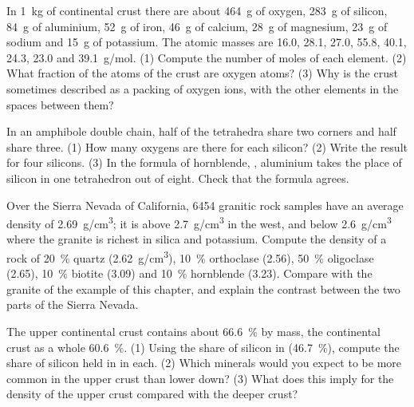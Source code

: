 \begin{exercise}[$\star\star\star$]\label{exo:g11:minerals:12}
In \qty{1}{kg} of continental crust there are about \qty{464}{g} of oxygen,
\qty{283}{g} of silicon, \qty{84}{g} of aluminium, \qty{52}{g} of iron,
\qty{46}{g} of calcium, \qty{28}{g} of magnesium, \qty{23}{g} of sodium and
\qty{15}{g} of potassium. The atomic masses are \qty{16.0}{}, \qty{28.1}{},
\qty{27.0}{}, \qty{55.8}{}, \qty{40.1}{}, \qty{24.3}{}, \qty{23.0}{} and
\qty{39.1}{g/mol}. (1) Compute the number of moles of each element. (2) What
fraction of the atoms of the crust are oxygen atoms? (3) Why is the crust
sometimes described as a packing of oxygen ions, with the other elements in
the spaces between them?
\end{exercise}

\begin{exercise}[$\star\star\star$]\label{exo:g11:minerals:13}
In an amphibole double chain, half of the tetrahedra share two corners and
half share three. (1) How many oxygens are there for each silicon? (2) Write
the result for four silicons. (3) In the formula of hornblende,
, aluminium takes the place of silicon in
one tetrahedron out of eight. Check that the formula agrees.
\end{exercise}

\begin{exercise}[$\star\star\star$]\label{exo:g11:minerals:14}
Over the Sierra Nevada of California, \num{6454} granitic rock samples have
an average density of \qty{2.69}{g/cm^3}; it is above \qty{2.7}{g/cm^3} in
the west, and below \qty{2.6}{g/cm^3} where the granite is richest in silica
and potassium. Compute the density of a rock of \qty{20}{\percent} quartz
(\qty{2.62}{g/cm^3}), \qty{10}{\percent} orthoclase (\qty{2.56}{}),
\qty{50}{\percent} oligoclase (\qty{2.65}{}), \qty{10}{\percent} biotite
(\qty{3.09}{}) and \qty{10}{\percent} hornblende (\qty{3.23}{}). Compare
with the granite of the example of this chapter, and explain the contrast
between the two parts of the Sierra Nevada.
\end{exercise}

\begin{exercise}[$\star\star\star$]\label{exo:g11:minerals:15}
The upper continental crust contains about \qty{66.6}{\percent} 
by mass, the continental crust as a whole \qty{60.6}{\percent}. (1) Using
the share of silicon in  (\qty{46.7}{\percent}), compute the share
of silicon held in  in each. (2) Which minerals would you expect to
be more common in the upper crust than lower down? (3) What does this imply
for the density of the upper crust compared with the deeper crust?
\end{exercise}

